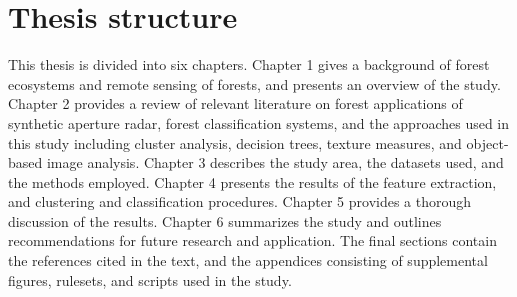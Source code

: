 \section{Thesis structure}
\label{sec: intro-thesis-structure}

This thesis is divided into six chapters. Chapter 1 gives a background of forest ecosystems and remote sensing of forests, and presents an overview of the study. Chapter 2 provides a review of relevant literature on forest applications of synthetic aperture radar, forest classification systems, and the approaches used in this study including cluster analysis, decision trees, texture measures, and object-based image analysis. Chapter 3 describes the study area, the datasets used, and the methods employed. Chapter 4 presents the results of the feature extraction, and clustering and classification procedures. Chapter 5 provides a thorough discussion of the results. Chapter 6 summarizes the study and outlines recommendations for future research and application. The final sections contain the references cited in the text, and the appendices consisting of supplemental figures, rulesets, and scripts used in the study.

